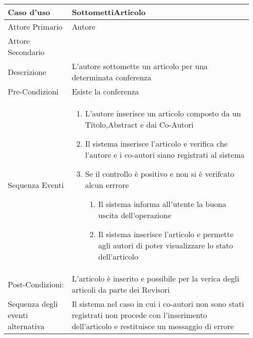 \begin{tabular}{|p{3cm}|p{7cm}|}
\hline 
\rowcolor{Orchid}
Caso d'uso & SottomettiArticolo \\
\hline
  Attore Primario & Autore\\
  \hline
  Attore Secondario & \\
\hline
Descrizione & L'autore sottomette un articolo per una determinata conferenza\\
\hline
Pre-Condizioni& Esiste la conferenza\\
\hline
  Sequenza Eventi &
                    \begin{enumerate}
                    \item L'autore inserisce un articolo composto da un Titolo,Abstract e dai Co-Autori
                    \item Il sistema inserisce l'articolo e verifica che l'autore e i co-autori siano registrati al sistema
                    \item Se il controllo è positivo e non si è verifcato alcun errrore
                      \begin{enumerate}
                      \item Il sistema informa all'utente la buona uscita dell'operazione
                      \item Il sistema inserisce l'articolo e permette agli autori di poter visualizzare lo stato dell'articolo
                      \end{enumerate}
                    \end{enumerate} \\
\hline
Post-Condizioni: &L'articolo è inserito e possibile per la verica degli articoli da parte dei Revisori\\
\hline
Sequenza degli eventi alternativa & Il sistema nel caso in cui i co-autori non sono stati registrati non procede con l'inserimento dell'articolo e restituisce un messaggio di errore\\
\hline
\end{tabular}

